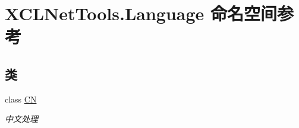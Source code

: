 \hypertarget{namespace_x_c_l_net_tools_1_1_language}{}\section{X\+C\+L\+Net\+Tools.\+Language 命名空间参考}
\label{namespace_x_c_l_net_tools_1_1_language}
\subsection*{类}
\begin{DoxyCompactItemize}
\item 
class \hyperlink{class_x_c_l_net_tools_1_1_language_1_1_c_n}{CN}
\begin{DoxyCompactList}\small\item\em 中文处理 \end{DoxyCompactList}\end{DoxyCompactItemize}

